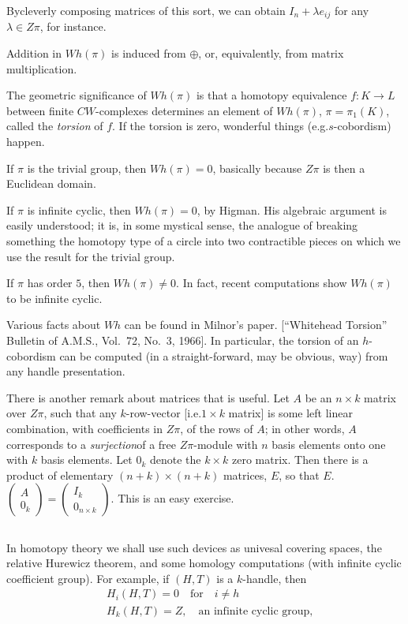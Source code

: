 By\pageoriginale cleverly composing matrices of this sort, we can obtain $I_{n}+\lambda e_{ij}$ for any $\lambda \in Z\pi$, for instance.

Addition in $Wh(\pi)$ is induced from $\oplus$, or, equivalently, from matrix multiplication.

The geometric significance of $Wh(\pi)$ is that a homotopy equivalence $f:K\to L$ between finite $CW$-complexes determines an element of $Wh(\pi)$, $\pi=\pi_{1}(K)$, called the {\em torsion} of $f$. If the torsion is zero, wonderful things (e.g.\@ $s$-cobordism) happen.

If $\pi$ is the trivial group, then $Wh(\pi)=0$, basically because $Z\pi$ is then a Euclidean domain.

If $\pi$ is infinite cyclic, then $Wh(\pi)=0$, by Higman. His algebraic argument is easily understood; it is, in some mystical sense, the analogue of breaking something the homotopy type of a circle into two contractible pieces on which we use the result for the trivial group.

If $\pi$ has order $5$, then $Wh(\pi)\neq 0$. In fact, recent computations show $Wh(\pi)$ to be infinite cyclic.

Various facts about $Wh$ can be found in Milnor's paper. [``Whitehead Torsion'' Bulletin of A.M.S., Vol.~72, No.~3, 1966]. In particular, the torsion of an $h$-cobordism can be computed (in a straight-forward, may be obvious, way) from any handle presentation.

There is another remark about matrices that is useful. Let $A$ be an $n\times k$ matrix over $Z\pi$, such that any $k$-row-vector [i.e.\@ $1\times k$ matrix] is some left linear combination, with coefficients in $Z \pi$, of the rows of $A$; in other words, $A$ corresponds to a {\em surjection}\pageoriginale of a free $Z\pi$-module with $n$ basis elements onto one with $k$ basis elements. Let $0_{k}$ denote the $k\times k$ zero matrix. Then there is a product of elementary $(n+k)\times (n+k)$ matrices, $E$, so that $E$. $\left(\begin{smallmatrix} A\\ 0_{k}\end{smallmatrix}\right)=\left(\begin{smallmatrix}I_{k}\\ 0_{n\times k}\end{smallmatrix}\right)$. This is an easy exercise.

\subsection{}\label{chap8-sec8.3.7}
In homotopy theory we shall use such devices as univesal covering spaces, the relative Hurewicz theorem, and some homology computations (with infinite cyclic coefficient group). For example, if $(H,T)$ is a $k$-handle, then
\begin{align*}
& H_{i}(H,T)=0\quad\text{for}\quad i\neq h\\
& H_{k}(H,T)=Z,\quad \text{an infinite cyclic group,}
\end{align*}

